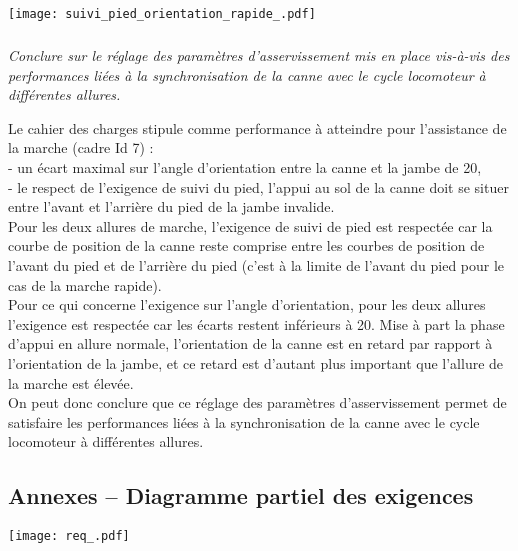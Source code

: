 \begin{multicols}{2}
\begin{center}%
\texttt{[image: suivi\_pied\_orientation\_rapide\_.pdf]}
\end{center}


\fi

\subparagraph{}\textit{Conclure sur le réglage des paramètres d'asservissement mis en place vis-à-vis des performances liées à la synchronisation de la canne avec le cycle locomoteur à différentes allures.}

\ifprof
\begin{corrige}
Le cahier des charges stipule comme performance à atteindre pour l'assistance de la marche (cadre Id 7) :\\
- un écart maximal sur l'angle d'orientation entre la canne et la jambe de 20\degre,\\
- le respect de l'exigence de suivi du pied, l'appui au sol de la canne doit se situer entre l'avant et l'arrière du pied de la jambe invalide.\\
Pour les deux allures de marche, l'exigence de suivi de pied est respectée car la courbe de position de la canne reste comprise entre les courbes de position de l'avant du pied et de l'arrière du pied (c'est à la limite de l'avant du pied pour le cas de la marche rapide).\\
Pour ce qui concerne l'exigence sur l'angle d'orientation, pour les deux allures l'exigence est respectée car les écarts restent inférieurs à 20\degre. Mise à part la phase d'appui en allure normale, l'orientation de la canne est en retard par rapport à l'orientation de la jambe, et ce retard est d'autant plus important que l'allure de la marche est élevée.\\
On peut donc conclure que ce réglage des paramètres d'asservissement permet de satisfaire les performances liées à la synchronisation de la canne avec le cycle locomoteur à différentes allures.
\end{corrige}
\fi




\ifprof
\else
\subsection*{Annexes -- Diagramme partiel des exigences\label{Annexe_diag_exigences}}
\begin{center}
\texttt{[image: req\_.pdf]}

\end{center}
\fi






\ifprof
\else
\end{multicols}
\fi


